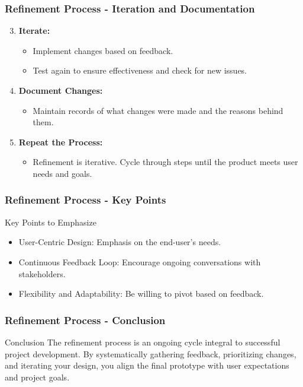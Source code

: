 \documentclass[aspectratio=169]{beamer}
\begin{document}
\begin{frame}[fragile]
    \frametitle{Refinement Process - Iteration and Documentation}
    \begin{enumerate}
        \setcounter{enumi}{2}
        \item \textbf{Iterate:}
            \begin{itemize}
                \item Implement changes based on feedback.
                \item Test again to ensure effectiveness and check for new issues.
            \end{itemize}
        \item \textbf{Document Changes:}
            \begin{itemize}
                \item Maintain records of what changes were made and the reasons behind them.
            \end{itemize}
        \item \textbf{Repeat the Process:}
            \begin{itemize}
                \item Refinement is iterative. Cycle through steps until the product meets user needs and goals.
            \end{itemize}
    \end{enumerate}
\end{frame}

\begin{frame}[fragile]
    \frametitle{Refinement Process - Key Points}
    \begin{block}{Key Points to Emphasize}
        \begin{itemize}
            \item User-Centric Design: Emphasis on the end-user's needs.
            \item Continuous Feedback Loop: Encourage ongoing conversations with stakeholders.
            \item Flexibility and Adaptability: Be willing to pivot based on feedback.
        \end{itemize}
    \end{block}
\end{frame}

\begin{frame}[fragile]
    \frametitle{Refinement Process - Conclusion}
    \begin{block}{Conclusion}
        The refinement process is an ongoing cycle integral to successful project development. By systematically gathering feedback, prioritizing changes, and iterating your design, you align the final prototype with user expectations and project goals.
    \end{block}
\end{frame}
\end{document}
